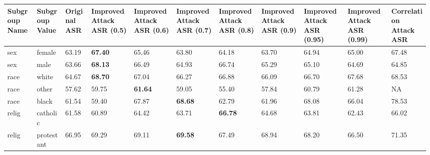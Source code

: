 \documentclass{article}
\begin{document}
\begin{table}
    \tiny
    \begin{tabular}{p{1cm}p{1cm}p{1cm}p{1cm}p{1cm}p{1cm}p{1cm}p{1cm}p{1cm}p{1cm}p{1cm}}
        \hline
        Subgroup Name   & Subgroup Value   &   Original ASR &   Improved Attack ASR (0.5) &   Improved Attack ASR (0.6) &   Improved Attack ASR (0.7) &   Improved Attack ASR (0.8) &   Improved Attack ASR (0.9) &   Improved Attack ASR (0.95) &   Improved Attack ASR (0.99) & Correlation Attack ASR \\
        \hline
         sex             & female           &          63.19 &                       \textbf{67.40} &                       65.46 &                       63.80 &                       64.18 &                       63.70 &                        64.94 &                        65.00  & 67.48 \\
         sex             & male             &          63.66 &                       \textbf{68.13} &                       66.49 &                       64.93 &                       66.74 &                       65.29 &                        65.10 &                        64.69 & 64.85 \\
         race            & white            &          64.67 &                       \textbf{68.70} &                       67.04 &                       66.27 &                       66.88 &                       66.09 &                        66.70 &                        67.68 & 68.53 \\
         race            & other            &          57.62 &                       59.75 &                       \textbf{61.64} &                       59.05 &                       55.40 &                       57.84 &                        60.79 &                        61.28 & NA \\
         race            & black            &          61.54 &                       59.40 &                       67.87 &                       \textbf{68.68} &                       62.79 &                       61.96 &                        68.08 &                        66.04 & 78.53 \\
         relig           & catholic         &          61.58 &                       60.89 &                       64.42 &                       63.71 &                       \textbf{66.78} &                       64.68 &                        63.81 &                        62.43 & 66.02 \\
         relig           & protestant       &          66.95 &                       69.29 &                       69.11 &                       \textbf{69.58} &                       67.49 &                       68.94 &                        68.20 &                        66.50 & 71.35 \\

\end{tabular}
\end{table}
\end{document}
